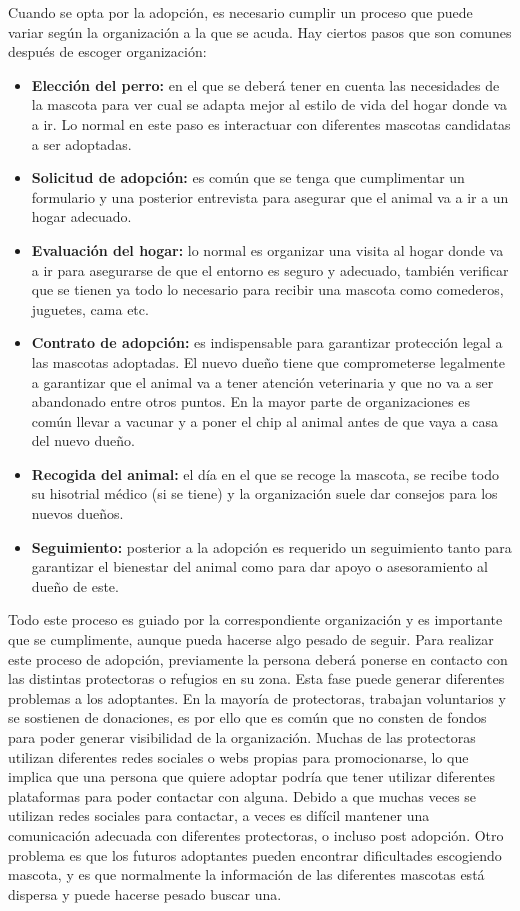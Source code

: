 \documentclass[a4paper, 12pt]{article}
\begin{document}
Cuando se opta por la adopción, es necesario cumplir un proceso que puede variar según la organización a la que se acuda. Hay ciertos pasos que son comunes después de escoger organización:
\begin{itemize}
\item \textbf{Elección del perro:} en el que se deberá tener en cuenta las necesidades de la mascota para ver cual se adapta mejor al estilo de vida del hogar donde va a ir. Lo normal en este paso es interactuar con diferentes mascotas candidatas a ser adoptadas.
\item\textbf{Solicitud de adopción:} es común que se tenga que cumplimentar un formulario y una posterior entrevista para asegurar que el animal va a ir a un hogar adecuado.
\item \textbf{Evaluación del hogar:} lo normal es organizar una visita al hogar donde va a ir para asegurarse de que el entorno es seguro y adecuado, también verificar que se tienen ya todo lo necesario para recibir una mascota como comederos, juguetes, cama etc.
\item \textbf{Contrato de adopción:} es indispensable para garantizar protección legal a las mascotas adoptadas. El nuevo dueño tiene que comprometerse legalmente a garantizar que el animal va a tener atención veterinaria y que no va a ser abandonado entre otros puntos. En la mayor parte de organizaciones es común llevar a vacunar y a poner el chip al animal antes de que vaya a casa del nuevo dueño.
\item \textbf{Recogida del animal:} el día en el que se recoge la mascota, se recibe todo su hisotrial médico (si se tiene) y la organización suele dar consejos para los nuevos dueños.
\item \textbf{Seguimiento:} posterior a la adopción es requerido un seguimiento tanto para garantizar el bienestar del animal como para dar apoyo o asesoramiento al dueño de este.
\end{itemize}

Todo este proceso es guiado por la correspondiente organización y es importante que se cumplimente, aunque pueda hacerse algo pesado de seguir. Para realizar este proceso de adopción, previamente la persona deberá ponerse en contacto con las distintas protectoras o refugios en su zona. Esta fase puede generar diferentes problemas a los adoptantes. En la mayoría de protectoras, trabajan voluntarios y se sostienen de donaciones, es por ello que es común que no consten de fondos para poder generar visibilidad de la organización. Muchas de las protectoras utilizan diferentes redes sociales o webs propias para promocionarse, lo que implica que una persona que quiere adoptar podría que tener utilizar diferentes plataformas para poder contactar con alguna. Debido a que muchas veces se utilizan redes sociales para contactar, a veces es difícil mantener una comunicación adecuada con diferentes protectoras, o incluso post adopción. Otro problema es que los futuros adoptantes pueden encontrar dificultades escogiendo mascota, y es que normalmente la información de las diferentes mascotas está dispersa y puede hacerse pesado buscar una. 
\end{document}

